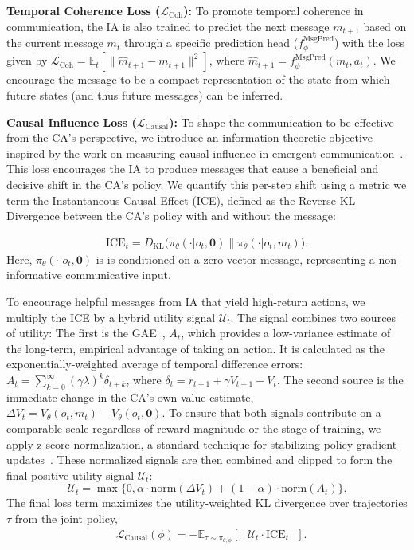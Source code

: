 \documentclass[letterpaper]{article} %
\begin{document}
\textbf{Temporal Coherence Loss ($\mathcal{L}_{\text{Coh}}$):} To promote temporal coherence in communication, the IA is also trained to predict the next message $m_{t+1}$ based on the current message $m_t$ through a specific prediction head ($f_{\phi}^{\text{MsgPred}}$) with the loss given by $\mathcal{L}_{\text{Coh}} = \mathbb{E}_t \left[ \| \hat{m}_{t+1} - m_{t+1} \|^2 \right]$, where $\hat{m}_{t+1} = f_{\phi}^{\text{MsgPred}}(m_t, a_t)$. We encourage the message to be a compact representation of the state from which future states (and thus future messages) can be inferred. 

\textbf{Causal Influence Loss ($\mathcal{L}_{\text{Causal}}$):} To shape the communication to be effective from the CA's perspective, we introduce an information-theoretic objective inspired by the work on measuring causal influence in emergent communication~\cite{lowe2019pitfalls}. This loss encourages the IA to produce messages that cause a beneficial and decisive shift in the CA's policy. We quantify this per-step shift using a metric we term the Instantaneous Causal Effect (ICE), defined as the Reverse KL Divergence between the CA's policy with and without the message:

\begin{align}
    \text{ICE}_t =D_{\text{KL}}\Big(\pi_{\theta}(\cdot|o_t, \mathbf{0}) \parallel \pi_{\theta}(\cdot|o_t, m_t)\Big). \tag{ICE}
    \label{eq:ice}
\end{align}
Here, $\pi_{\theta}(\cdot|o_t, \mathbf{0})$ is is conditioned on a zero-vector message, representing a non-informative communicative input.

To encourage helpful messages from IA that yield high-return actions, we multiply the ICE by a hybrid utility signal $\mathcal{U}_t$. The signal combines two sources of utility: The first is the GAE~\cite{schulman2015high}, $A_t$, which provides a low-variance estimate of the long-term, empirical advantage of taking an action. It is calculated as the exponentially-weighted average of temporal difference errors: $A_t = \sum_{k=0}^{\infty} (\gamma\lambda)^k \delta_{t+k}$, where $\delta_t = r_{t+1} + \gamma V_{t+1} - V_t$. The second source is the immediate change in the CA's own value estimate, $\Delta V_t = V_{\theta}(o_t, m_t) - V_{\theta}(o_t, \mathbf{0})$. To ensure that both signals contribute on a comparable scale regardless of reward magnitude or the stage of training, we apply z-score normalization, a standard technique for stabilizing policy gradient updates~\cite{schulman2017proximal, ioffe2015batch}. These normalized signals are then combined and clipped to form the final positive utility signal $\mathcal{U}_t$:
$$\mathcal{U}_t = \max\{0, \alpha \cdot \text{norm}(\Delta V_t) + (1-\alpha) \cdot \text{norm}(A_t)\}.$$
The final loss term maximizes the utility-weighted KL divergence over trajectories $\tau$ from the joint policy,
\begin{align*}
    &\mathcal{L}_{\text{Causal}}(\phi) = - \mathbb{E}_{\tau \sim \pi_{\theta, \phi}} \left[\mbox{ } \mathcal{U}_t \cdot \text{ICE}_t\mbox{ } \right].
\end{align*}
\end{document}
